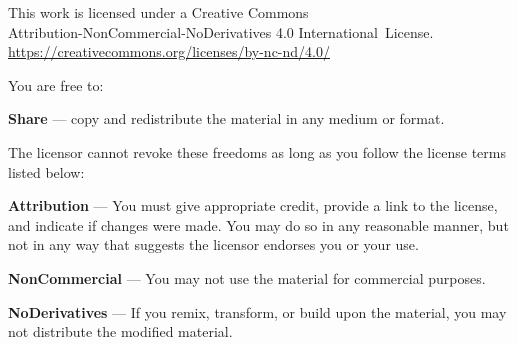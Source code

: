 
\clearpage
\thispagestyle{plain}

{%

  \ifafive\fontsize{11}{17}\selectfont\fi%
  \ifninebythirteen\fontsize{8}{11}\selectfont\fi%
  \ifbfive\fontsize{13.5}{20}\selectfont\fi%

  \setlength{\parindent}{0pt}%
  \raggedright\label{copyright-details}%
  \ifafive\setlength{\parskip}{4.5pt}\fi%
  \ifninebythirteen\setlength{\parskip}{2.5pt}\fi%
  \ifbfive\setlength{\parskip}{6.5pt}\fi%

  {\centering

    \ifafive{\fontsize{25}{18}\selectfont \ccbyncnd}\fi
    \ifninebythirteen{\fontsize{18}{10}\selectfont \ccbyncnd}\fi
    \ifbfive{\fontsize{40}{20}\selectfont \ccbyncnd}\fi

    \ifninebythirteen

      \vspace{0.15cm}

    \else

      \vspace{0.3cm}

    \fi

    This work is licensed under a Creative Commons\\
    Attribution-NonCommercial-NoDerivatives 4.0 International~License.\\
    \href{https://creativecommons.org/licenses/by-nc-nd/4.0/}{https://creativecommons.org/licenses/by-nc-nd/4.0/}

    \ifninebythirteen

      \vspace{0.1cm}

    \else

      \vspace{0.2cm}

    \fi

  }

  You are free to:

  \begin{packeditemize}
    \item \textbf{Share} — copy and redistribute the material in any medium or format.
  \end{packeditemize}

  The licensor cannot revoke these freedoms as long as you follow the license terms listed below:

  \begin{packeditemize}
    \item \textbf{Attribution} — You must give appropriate credit, provide a link to the license, and indicate if changes were made. You may do so in any reasonable manner, but not in any way that suggests the licensor endorses you or your use.
    \item \textbf{NonCommercial} — You may not use the material for commercial purposes.
    \item \textbf{NoDerivatives} — If you remix, transform, or build upon the material, you may not distribute the modified material.
  \end{packeditemize}

}
